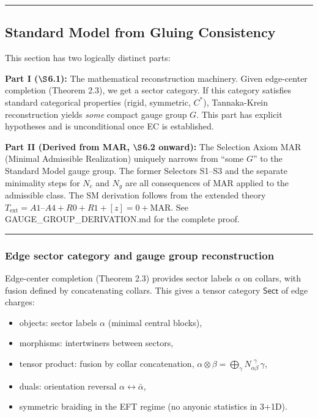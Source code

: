 \documentclass[11pt,a4paper]{article}
\theoremstyle{remark}
\providecommand{\tightlist}{%
  \setlength{\itemsep}{0pt}\setlength{\parskip}{0pt}}
\begin{document}
\begin{center}\rule{0.5\linewidth}{0.5pt}\end{center}

\subsection{Standard Model from Gluing Consistency}\label{standard-model-from-gluing-consistency}

This section has two logically distinct parts:

\textbf{Part I (\ensuremath{\S}6.1):} The mathematical reconstruction machinery. Given
edge-center completion (Theorem 2.3), we get a sector category. If this
category satisfies standard categorical properties (rigid, symmetric, \(C^*\)),
Tannaka-Krein reconstruction yields \emph{some} compact gauge group \(G\). This part
has explicit hypotheses and is unconditional once EC is established.

\textbf{Part II (Derived from MAR, \ensuremath{\S}6.2 onward):} The Selection Axiom MAR
(Minimal Admissible Realization) uniquely narrows from ``some \(G\)'' to the
Standard Model gauge group. The former Selectors S1--S3 and the separate
minimality steps for \(N_c\) and \(N_g\) are all consequences of MAR applied to
the admissible class. The SM derivation follows from the extended theory
\(T_{\mathrm{ext}} = A1\text{--}A4 + R0 + R1 + [z]=0 + \mathrm{MAR}\).
See GAUGE\_GROUP\_DERIVATION.md for the complete proof.

\begin{center}\rule{0.5\linewidth}{0.5pt}\end{center}

\subsubsection{Edge sector category and gauge group reconstruction}\label{edge-sector-category-and-gauge-group-reconstruction}

Edge-center completion (Theorem 2.3) provides sector labels \(\alpha\) on collars,
with fusion defined by concatenating collars. This gives a tensor category
\(\mathsf{Sect}\) of edge charges:

\begin{itemize}
\tightlist
\item
  objects: sector labels \(\alpha\) (minimal central blocks),
\item
  morphisms: intertwiners between sectors,
\item
  tensor product: fusion by collar concatenation, \(\alpha \otimes \beta = \bigoplus_\gamma N_{\alpha\beta}^{\ \ \gamma}\,\gamma\),
\item
  duals: orientation reversal \(\alpha \leftrightarrow \bar\alpha\),
\item
  symmetric braiding in the EFT regime (no anyonic statistics in 3+1D).
\end{itemize}
\end{document}
